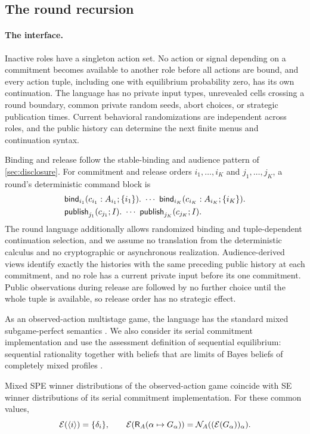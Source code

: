 \subsection{The round recursion}

\paragraph{The interface.}
Inactive roles have a singleton action set. No action or signal depending on a commitment becomes available to another role before all actions are bound, and every action tuple, including one with equilibrium probability zero, has its own continuation. The language has no private input types, unrevealed cells crossing a round boundary, common
private random seeds, abort choices, or strategic publication times. Current behavioral randomizations are independent across roles, and the public history can determine the next finite menus and continuation syntax.

Binding and release follow the stable-binding and audience pattern of \cref{sec:disclosure}. For commitment and release orders $i_1,\ldots,i_K$ and $j_1,\ldots,j_K$, a round's deterministic command block is
\[
 \begin{aligned}
 &\mathsf{bind}_{i_1}(c_{i_1}:A_{i_1};\{i_1\}).\ \cdots\
       \mathsf{bind}_{i_K}(c_{i_K}:A_{i_K};\{i_K\}).\\
 &\mathsf{publish}_{j_1}(c_{j_1};I).\ \cdots\ \mathsf{publish}_{j_K}(c_{j_K};I).
 \end{aligned}
\]
The round language additionally allows randomized binding and tuple-dependent continuation selection, and we assume no translation from the deterministic calculus and no cryptographic or asynchronous realization. Audience-derived views identify exactly the histories with the same preceding public history at each commitment, and no role has a current
private input before its one commitment. Public observations during release are followed by no further choice until the whole tuple is available, so release order has no strategic effect.

As an observed-action multistage game, the language has the standard mixed subgame-perfect semantics \cite[Sections~3.2 and 4.2]{FudenbergTirole1991}. We also consider its serial commitment implementation and use the assessment definition of sequential equilibrium: sequential rationality together with beliefs that are limits of Bayes beliefs of
completely mixed profiles \cite{KrepsWilson1982}.

\begin{proposition}\label{se:thm:round}
Mixed SPE winner distributions of the observed-action game coincide with SE winner distributions of its serial commitment implementation. For these common values,
\[
 \mathcal E(\langle i\rangle)=\{\delta_i\},\qquad
 \mathcal E(\mathsf R_A(\alpha\mapsto G_\alpha))=
        \mathcal N_A((\mathcal E(G_\alpha))_\alpha).
\]
\end{proposition}

